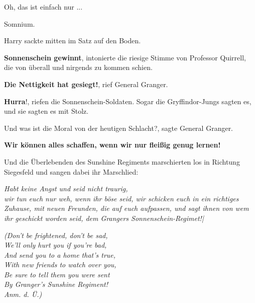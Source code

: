 \glqq{}Oh, das ist einfach nur ...\grqq{}

\glqq{}Somnium.\grqq{}

Harry sackte mitten im Satz auf den Boden.

\textbf{\glqq{}Sonnenschein gewinnt\grqq{}}, intonierte die riesige Stimme von
Professor Quirrell, die von überall und nirgends zu kommen schien.

\glqq{}\textbf{Die Nettigkeit hat gesiegt!}\grqq{}, rief General Granger.

\glqq{}\textbf{Hurra}!\grqq{}, riefen die Sonnenschein-Soldaten. Sogar die
Gryffindor-Jungs sagten es, und sie sagten es mit Stolz.

\glqq{}Und was ist die Moral von der heutigen Schlacht?\grqq{}, sagte General
Granger.

\textbf{\glqq{}Wir können alles schaffen, wenn wir nur fleißig genug
lernen!\grqq{}}

Und die Überlebenden des Sunshine Regiments marschierten los in Richtung
Siegesfeld und sangen dabei ihr Marschlied:

\emph{Habt keine Angst und seid nicht traurig,\\
wir tun euch nur weh, wenn ihr böse seid, wir schicken euch in ein richtiges
Zuhause, mit neuen Freunden, die auf euch aufpassen, und sagt ihnen von wem ihr
geschickt worden seid, dem Grangers Sonnenschein-Regimet!|}

\emph{(Don't be frightened, don't be sad,\\
We'll only hurt you if you're bad,\\
And send you to a home that's true,\\
With new friends to watch over you,\\
Be sure to tell them you were sent\\
By Granger's Sunshine Regiment!\\
Anm. d. Ü.)}
